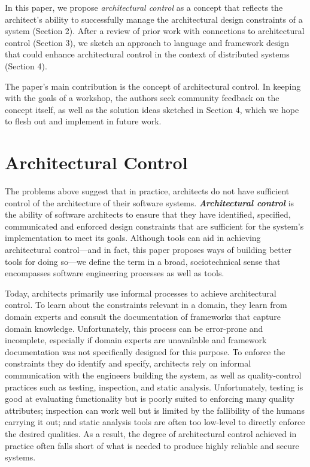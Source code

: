 \documentclass[runningheads]{llncs}
\begin{document}
\begin{sloppypar}
In this paper, we propose \emph{architectural control} as a concept that reflects the architect's ability to successfully manage the architectural design constraints of a system (Section 2).  After a review of prior work with connections to architectural control (Section 3), we sketch an approach to language and framework design that could enhance architectural control in the context of distributed systems (Section 4).

The paper's main contribution is the concept of architectural control.  In keeping with the goals of a workshop, the authors seek community feedback on the concept itself, as well as the solution ideas sketched in Section 4, which we hope to flesh out and implement in future work.


\section{Architectural Control}

The problems above suggest that in practice, architects do not have sufficient control of the architecture of their software systems.  \emph{\textbf{Architectural control}} is the ability of software architects to ensure that they have identified, specified, communicated and enforced design constraints that are sufficient for the system's implementation to meet its goals.  Although tools can aid in achieving architectural control---and in fact, this paper proposes ways of building better tools for doing so---we define the term in a broad, sociotechnical sense that encompasses software engineering processes as well as tools.

Today, architects primarily use informal processes to achieve architectural control.  To learn about the constraints relevant in a domain, they learn from domain experts and consult the documentation of frameworks that capture domain knowledge.  Unfortunately, this process can be error-prone and incomplete, especially if domain experts are unavailable and framework documentation was not specifically designed for this purpose.  To enforce the constraints they do identify and specify, architects  rely on informal communication with the engineers building the system, as well as quality-control practices such as testing, inspection, and static analysis.  Unfortunately, testing is good at evaluating functionality but is poorly suited to enforcing many quality attributes; inspection can work well but is limited by the fallibility of the humans carrying it out; and static analysis tools are often too low-level to directly enforce the desired qualities.  As a result, the degree of architectural control achieved in practice often falls short of what is needed to produce highly reliable and secure systems.



\end{sloppypar}
\end{document}
